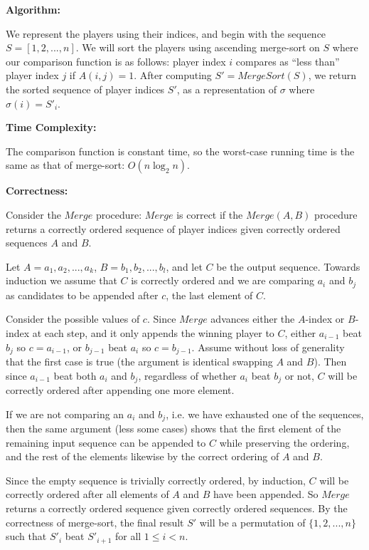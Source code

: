 \documentclass[letterpaper,12pt]{article}
\begin{document}
\vspace{2mm}
\textbf{Algorithm:}

We represent the players using their indices, and begin with the sequence $S =
[1, 2, ..., n]$. We will sort the players using ascending merge-sort on $S$
where our comparison function is as follows: player index $i$ compares as ``less
than'' player index $j$ if $A(i,j) = 1$. After computing $S' = MergeSort(S)$, we
return the sorted sequence of player indices $S'$, as a representation of $\sigma$
where $\sigma(i) = S'_i$.

\vspace{2mm}
\textbf{Time Complexity:}

The comparison function is constant time, so the worst-case running time is the
same as that of merge-sort: $O(n \log_2 n)$.

\vspace{2mm}
\textbf{Correctness:}

Consider the $Merge$ procedure: $Merge$ is correct if the $Merge(A,B)$ procedure
returns a correctly ordered sequence of player indices given correctly ordered
sequences $A$ and $B$.

Let $A = a_1,a_2,...,a_k$, $B = b_1,b_2,...,b_l$, and let $C$ be the
output sequence. Towards induction we assume that $C$ is correctly ordered and
we are comparing $a_i$ and $b_j$ as candidates to be appended after $c$, the
last element of $C$.

Consider the possible values of $c$. Since $Merge$ advances either the $A$-index
or $B$-index at each step, and it only appends the winning player to $C$, either
$a_{i-1}$ beat $b_j$ so $c = a_{i-1}$, or $b_{j-1}$ beat $a_i$ so $c = b_{j-1}$.
Assume without loss of generality that the first case is true (the argument is
identical swapping $A$ and $B$). Then since $a_{i-1}$ beat both $a_i$ and $b_j$,
regardless of whether $a_i$ beat $b_j$ or not, $C$ will be correctly ordered
after appending one more element.

If we are not comparing an $a_i$ and $b_j$, i.e. we have exhausted one of the
sequences, then the same argument (less some cases) shows that the first element
of the remaining input sequence can be appended to $C$ while preserving the
ordering, and the rest of the elements likewise by the correct ordering of $A$
and $B$.

Since the empty sequence is trivially correctly ordered, by induction, $C$ will
be correctly ordered after all elements of $A$ and $B$ have been appended. So
$Merge$ returns a correctly ordered sequence given correctly ordered sequences.
By the correctness of merge-sort, the final result $S'$ will be a permutation of
$\{1,2,...,n\}$ such that $S'_i$ beat $S'_{i+1}$ for all $1 \leq i < n$.
\end{document}
